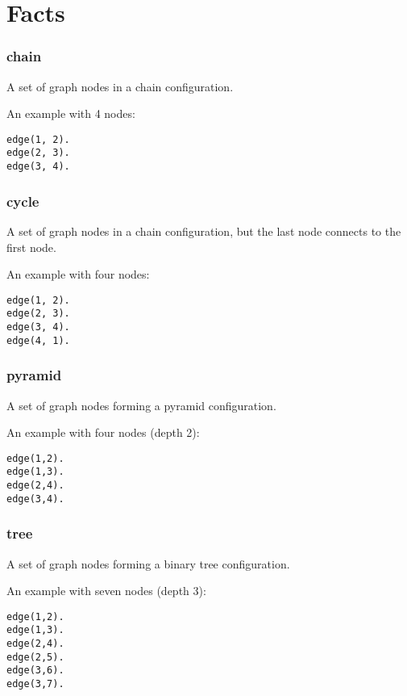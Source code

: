 \section{Facts}

\subsubsection*{chain}

A set of graph nodes in a chain configuration.

An example with 4 nodes:

\begin{Verbatim}
edge(1, 2).
edge(2, 3).
edge(3, 4).
\end{Verbatim}

\subsubsection*{cycle}

A set of graph nodes in a chain configuration, but the last node connects to the first node.

An example with four nodes:

\begin{Verbatim}
edge(1, 2).
edge(2, 3).
edge(3, 4).
edge(4, 1).
\end{Verbatim}

\subsubsection*{pyramid}

A set of graph nodes forming a pyramid configuration.

An example with four nodes (depth 2):

\begin{Verbatim}
edge(1,2).
edge(1,3).
edge(2,4).
edge(3,4).
\end{Verbatim}

\subsubsection*{tree}

A set of graph nodes forming a binary tree configuration.

An example with seven nodes (depth 3):

\begin{Verbatim}
edge(1,2).
edge(1,3).
edge(2,4).
edge(2,5).
edge(3,6).
edge(3,7).
\end{Verbatim}

